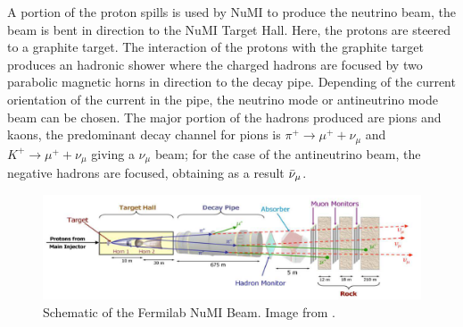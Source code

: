 A portion of the proton spills is used by NuMI to produce the neutrino beam, the beam is bent in direction to the NuMI Target Hall. Here, the protons are steered to a graphite target. The interaction of the protons with the graphite target produces an hadronic shower where the charged hadrons are focused by two parabolic magnetic horns in direction to the decay pipe. Depending of the current orientation of the current in the pipe, the neutrino mode or antineutrino mode beam can be chosen. The major portion of the hadrons produced are pions and kaons, the predominant decay channel for pions is $\pi^+ \longrightarrow \mu^+ + \nu_\mu$ and $K^+ \longrightarrow \mu^+ + \nu_\mu$ giving a $\nu_\mu$ beam; for the case of the antineutrino beam, the negative hadrons are focused, obtaining as a result $\Bar{\nu}_\mu$. 


\begin{figure}[!htb]
\centering
\includegraphics[scale=0.38]{Figures/Chapter2/NuMIScketch.png}
        \caption{Schematic of the Fermilab NuMI Beam. Image from \cite{Numi}.} 
\label{fig:MnvExp:NuMI:SchematicNuMIBeam}
\end{figure}

